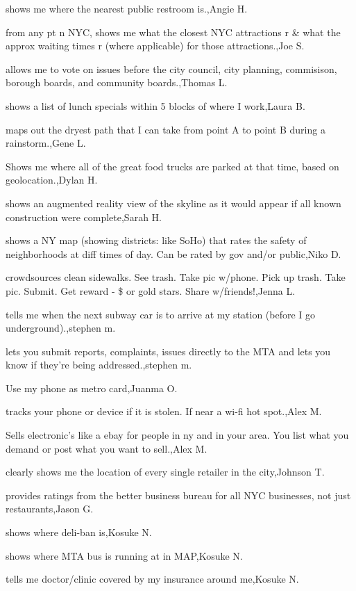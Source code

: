 \documentclass{article}
\begin{document}
shows me where the nearest public restroom is.,Angie H.

from any pt n NYC, shows me what the closest NYC attractions r \& what the approx waiting times r (where applicable) for those attractions.,Joe S.

allows me to vote on issues before the city council, city planning, commisison, borough boards, and community boards.,Thomas L.

shows a list of lunch specials within 5 blocks of where I work,Laura B.

maps out the dryest path that I can take from point A to point B during a rainstorm.,Gene L.

Shows me where all of the great food trucks are parked at that time, based on geolocation.,Dylan H.

shows an augmented reality view of the skyline as it would appear if all known construction were complete,Sarah H.

shows a NY map (showing districts: like SoHo) that rates the safety of neighborhoods at diff times of day. Can be rated by gov and/or public,Niko D.

crowdsources clean sidewalks. See trash. Take pic w/phone. Pick up trash. Take pic. Submit. Get reward - \$ or gold stars. Share w/friends!,Jenna L.

tells me when the next subway car is to arrive at my station (before I go underground).,stephen m.

lets you submit reports, complaints, issues directly to the MTA and lets you know if they're being addressed.,stephen m.

Use my phone as metro card,Juanma O.

tracks your phone or device if it is stolen. If near a wi-fi hot spot.,Alex M.

Sells electronic's like a ebay for people in ny and in your area. You list what you demand or post what you want to sell.,Alex M.

clearly shows me the location of every single retailer in the city,Johnson T.

provides ratings from the better business bureau for all NYC businesses, not just restaurants,Jason G.

shows where deli-ban is,Kosuke N.

shows where MTA bus is running at in MAP,Kosuke N.

tells me doctor/clinic covered by my insurance around me,Kosuke N.
\end{document}
